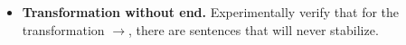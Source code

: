 \documentclass[11pt,class=report,crop=false]{standalone}
\begin{document}
\begin{activite}
\begin{enumerate}
\begin{itemize}
	\item \textbf{Transformation without end.}
	Experimentally verify that for the transformation \rzero\run{} $\rightarrow$\run\run\rzero\rzero{}, there are sentences that will never stabilize.
	\end{itemize}

\end{enumerate}   
     
\end{activite}
\end{document}

